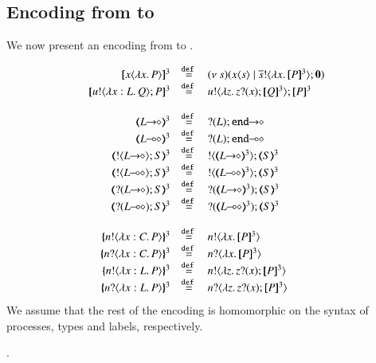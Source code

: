 \subsection{Encoding from \HOpp to \HOp}

We now present an encoding from \HOpp to \HOp.

\[
\begin{array}{rcl}
	\pmap{\appl{x}{\abs{x} P}}{3} &\defeq& \newsp{s}{\appl{x}{s} \Par \bout{\dual{s}}{\abs{x} \pmap{P}{3}} \inact}
	\\
	\pmap{\bout{u}{\abs{x: L}{Q}} P}{3} &\defeq& \bout{u}{\abs{z}{\binp{z}{x} \pmap{Q}{3}}} \pmap{P}{3}
	\\
	\\
	\tmap{\shot{L}}{3} &\defeq& \shot{\btinp{L} \tinact}
	\\
	\tmap{\lhot{L}}{3} &\defeq& \lhot{\btinp{L} \tinact}
	\\
	\tmap{\btout{\shot{L}} S}{3} &\defeq& \btout{\tmap{\shot{L}}{3}} \tmap{S}{3}
	\\
	\tmap{\btout{\lhot{L}} S}{3} &\defeq& \btout{\tmap{\lhot{L}}{3}} \tmap{S}{3}
	\\
	\tmap{\btinp{\shot{L}} S}{3} &\defeq& \btinp{\tmap{\shot{L}}{3}} \tmap{S}{3}
	\\
	\tmap{\btinp{\lhot{L}} S}{3} &\defeq& \btinp{\tmap{\lhot{L}}{3}} \tmap{S}{3}
	\\
	\\
	\mapa{\bactout{n}{\abs{x:C}{P}}}^{3} &\defeq& \bactout{n}{\abs{x}{\pmap{P}{3}}}
	\\
	\mapa{\bactinp{n}{\abs{x:C}{P}}}^{3} &\defeq& \bactinp{n}{\abs{x}{\pmap{P}{3}}}
	\\
	\mapa{\bactout{n}{\abs{x:L}{P}}}^{3} &\defeq& \bactout{n}{\abs{z}{\binp{z}{x} \pmap{P}{3}}}
	\\
	\mapa{\bactinp{n}{\abs{x:L}{P}}}^{3} &\defeq& \bactinp{n}{\abs{z}{\binp{z}{x} \pmap{P}{3}}}

\end{array}
\]
\noi We assume that the rest of the encoding is homomorphic on the syntax of
processes, types and labels, respectively.

.
